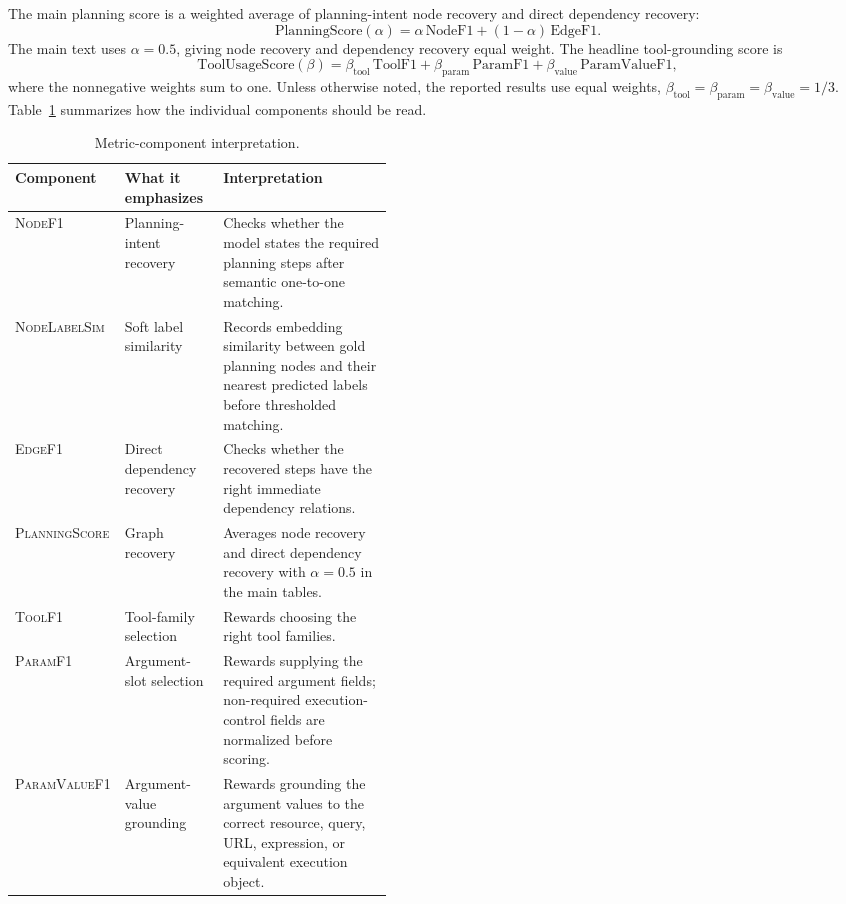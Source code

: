 \documentclass{article}
\providecommand{\metric}[1]{\textsc{#1}}
\begin{document}
The main planning score is a weighted average of planning-intent node recovery and direct dependency recovery:
\[
\mathrm{PlanningScore}(\alpha)=
\alpha\,\mathrm{NodeF1}+(1-\alpha)\,\mathrm{EdgeF1}.
\]
The main text uses $\alpha=0.5$, giving node recovery and dependency recovery equal weight. The headline tool-grounding score is
\[
\mathrm{ToolUsageScore}(\beta)=
\beta_{\mathrm{tool}}\,\mathrm{ToolF1}+
\beta_{\mathrm{param}}\,\mathrm{ParamF1}+
\beta_{\mathrm{value}}\,\mathrm{ParamValueF1},
\]
where the nonnegative weights sum to one. Unless otherwise noted, the reported results use equal weights, $\beta_{\mathrm{tool}}=\beta_{\mathrm{param}}=\beta_{\mathrm{value}}=1/3$. Table~\ref{tab:metric-weighting-notes} summarizes how the individual components should be read.

\begin{table}[H]
\centering
\scriptsize
\begin{tabularx}{\linewidth}{@{}p{0.18\linewidth}p{0.26\linewidth}X@{}}
\toprule
Component & What it emphasizes & Interpretation \\
\midrule
\metric{NodeF1} & Planning-intent recovery & Checks whether the model states the required planning steps after semantic one-to-one matching. \\
\metric{NodeLabelSim} & Soft label similarity & Records embedding similarity between gold planning nodes and their nearest predicted labels before thresholded matching. \\
\metric{EdgeF1} & Direct dependency recovery & Checks whether the recovered steps have the right immediate dependency relations. \\
\metric{PlanningScore} & Graph recovery & Averages node recovery and direct dependency recovery with $\alpha=0.5$ in the main tables. \\
\metric{ToolF1} & Tool-family selection & Rewards choosing the right tool families. \\
\metric{ParamF1} & Argument-slot selection & Rewards supplying the required argument fields; non-required execution-control fields are normalized before scoring. \\
\metric{ParamValueF1} & Argument-value grounding & Rewards grounding the argument values to the correct resource, query, URL, expression, or equivalent execution object. \\
\bottomrule
\end{tabularx}
\vspace{0.01cm}
\caption{Metric-component interpretation.}
\label{tab:metric-weighting-notes}
\end{table}
\end{document}
